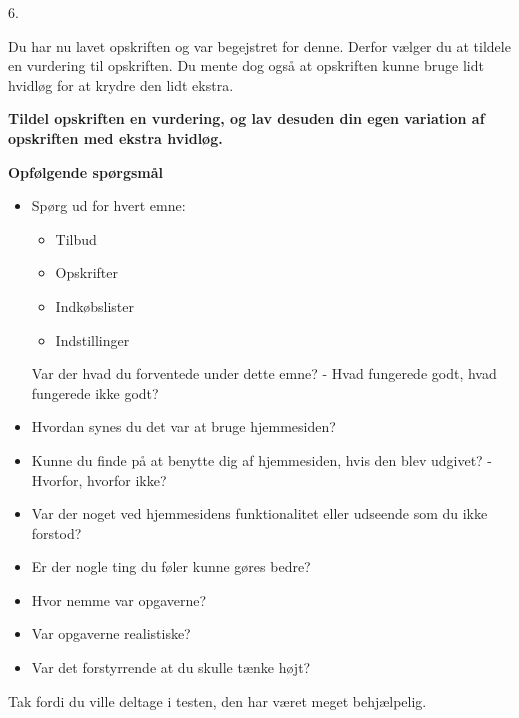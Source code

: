 6.

Du har nu lavet opskriften og var begejstret for denne. Derfor vælger du at tildele en vurdering til opskriften.
Du mente dog også at opskriften kunne bruge lidt hvidløg for at krydre den lidt ekstra.

\textbf{Tildel opskriften en vurdering, og lav desuden din egen variation af opskriften med ekstra hvidløg.}


\textbf{Opfølgende spørgsmål}

\begin{itemize}
	\item Spørg ud for hvert emne:
		\begin{itemize}
			\item Tilbud
			\item Opskrifter
			\item Indkøbslister
			\item Indstillinger
		\end{itemize}
	Var der hvad du forventede under dette emne? - Hvad fungerede godt, hvad fungerede ikke godt?
	\item Hvordan synes du det var at bruge hjemmesiden?
	\item Kunne du finde på at benytte dig af hjemmesiden, hvis den blev udgivet? - Hvorfor, hvorfor ikke?
	\item Var der noget ved hjemmesidens funktionalitet eller udseende som du ikke forstod?
	\item Er der nogle ting du føler kunne gøres bedre?
	\item Hvor nemme var opgaverne?
	\item Var opgaverne realistiske?
	\item Var det forstyrrende at du skulle tænke højt?
\end{itemize}	

Tak fordi du ville deltage i testen, den har været meget behjælpelig.

